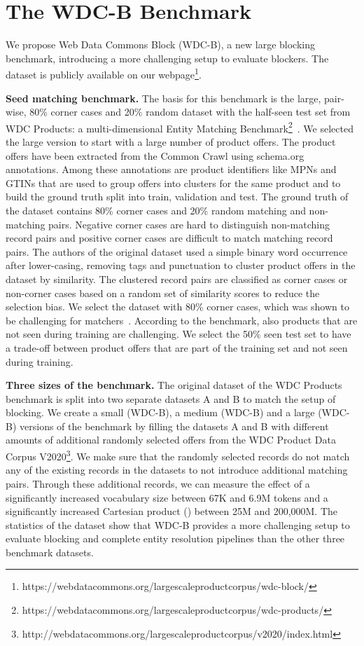 \documentclass[sigconf,nonacm]{acmart}
\begin{document}
\section{The WDC-B Benchmark}
\label{sec:wdc_b}
We propose Web Data Commons Block (WDC-B), a new large blocking benchmark, introducing a more challenging setup to evaluate blockers. 
The dataset is publicly available on our webpage\footnote{https://webdatacommons.org/largescaleproductcorpus/wdc-block/}.



\vspace{.1cm}\noindent\textbf{Seed matching benchmark.}
The basis for this benchmark is the large, pair-wise, 80\% corner cases and 20\% random dataset with the half-seen test set from WDC Products: a multi-dimensional Entity Matching Benchmark\footnote{https://webdatacommons.org/largescaleproductcorpus/wdc-products/}~\cite{peeters_wdc_2023}.
We selected the large version to start with a large number of product offers.
The product offers have been extracted from the Common Crawl using schema.org annotations. Among these annotations are product identifiers like MPNs and GTINs that are used to group offers into clusters for the same product and to build the ground truth split into train, validation and test.
The ground truth of the dataset contains 80\% corner cases and 20\% random matching and non-matching pairs.
Negative corner cases are hard to distinguish non-matching record pairs and positive corner cases are difficult to match matching record pairs.
The authors of the original dataset used a simple binary word occurrence after lower-casing, removing tags and punctuation to cluster product offers in the dataset by similarity.
The clustered record pairs are classified as corner cases or non-corner cases based on a random set of similarity scores to reduce the selection bias.
We select the dataset with 80\% corner cases, which was shown to be challenging for matchers~\cite{peeters_wdc_2023}.
According to the benchmark, also products that are not seen during training are challenging.
We select the 50\% seen test set to have a trade-off between product offers that are part of the training set and not seen during training.

\vspace{.1cm}\noindent\textbf{Three sizes of the benchmark.}
The original dataset of the WDC Products benchmark is split into two separate datasets A and B to match the setup of blocking.
We create a small (WDC-B), a medium (WDC-B) and a large (WDC-B) versions of the benchmark by filling the datasets A and B with different amounts of additional randomly selected offers from the WDC Product Data Corpus V2020\footnote{http://webdatacommons.org/largescaleproductcorpus/v2020/index.html}.
We make sure that the randomly selected records do not match any of the existing records in the datasets to not introduce additional matching pairs.
Through these additional records, we can measure the effect of a significantly increased vocabulary size between 67K and 6.9M tokens and a significantly increased Cartesian product () between 25M and 200,000M.
The statistics of the dataset show that WDC-B provides a more challenging setup to evaluate blocking and complete entity resolution pipelines than the other three benchmark datasets.
\end{document}
